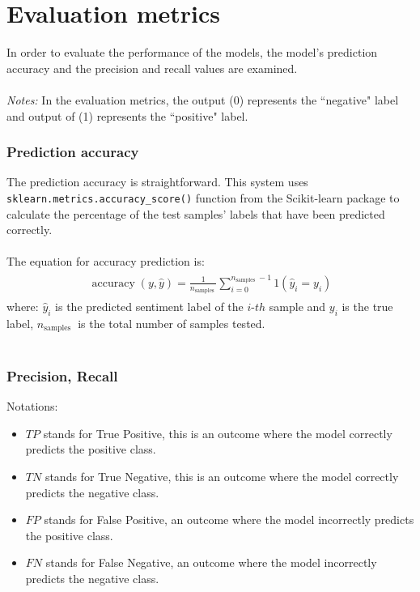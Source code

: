 \documentclass[a4paper]{report}
\newcommand{\code}[1]{\texttt{#1}}
\begin{document}
{{\section{Evaluation metrics}
In order to evaluate the performance of the models, the model's prediction accuracy and the precision and recall values are examined.
\\\\
\textit{Notes:} In the evaluation metrics, the output (0) represents the “negative" label and output of (1) represents the “positive" label.

\subsubsection{Prediction accuracy}
The prediction accuracy is straightforward. This system uses \code{sklearn.metrics.accuracy\_score()} function from the Scikit-learn package to calculate the percentage of the test samples' labels that have been predicted correctly.
\\\\
The equation for accuracy prediction is:
\begin{eqnarray*}
    \begin{aligned}
        \operatorname{accuracy}(y, \hat{y})=\frac{1}{n_{\text {samples }}} \sum_{i=0}^{n_{\text {samples }}-1} 1\left(\hat{y}_{i}=y_{i}\right)
    \end{aligned}
 \end{eqnarray*}
where: \(\hat{y}_{i}\) is the predicted sentiment label of the \(i\text{-}th\) sample and \(y_{i}\) is the true label, \(n_{\text {samples }}\) is the total number of samples tested.
\\\\
\subsubsection{Precision, Recall}
Notations:
\begin{itemize}
	\item \(TP\) stands for True Positive, this is an outcome where the model correctly predicts the positive class.
	\item \(TN\) stands for True Negative, this is an outcome where the model correctly predicts the negative class.
	\item \(FP\) stands for False Positive, an outcome where the model incorrectly predicts the positive class.
	\item \(FN\) stands for False Negative, an outcome where the model incorrectly predicts the negative class.
\end{itemize}

}}
\end{document}
